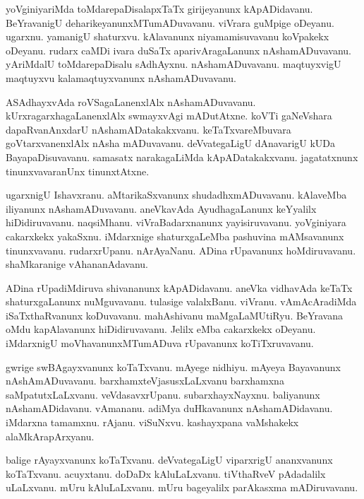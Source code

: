 \documentclass{article}
\begin{document}
\begin{mn}%
yoVginiyariMda toMdarepaDisalapxTaTx girijeyanunx kApADidavanu. BeYravanigU 
deharikeyanunxMTumADuvavanu. viVrara guMpige oDeyanu. ugarxnu. yamanigU shaturxvu. kAlavanunx 
niyamamisuvavanu koVpakekx oDeyanu. rudarx caMDi ivara duSaTx aparivAragaLanunx nAshamADuvavanu. 
yAriMdalU toMdarepaDisalu sAdhAyxnu. nAshamADuvavanu. maqtuyxvigU maqtuyxvu kalamaqtuyxvanunx 
nAshamADuvavanu.
\end{mn}

\begin{mn}%
ASAdhayxvAda roVSagaLanenxlAlx nAshamADuvavanu. kUrxragarxhagaLanenxlAlx swmayxvAgi mADutAtxne. 
koVTi gaNeVshara dapaRvanAnxdarU nAshamADatakakxvanu. keTaTxvareMbuvara goVtarxvanenxlAlx nAsha 
mADuvavanu. deVvategaLigU dAnavarigU kUDa BayapaDisuvavanu. samasatx narakagaLiMda 
kApADatakakxvanu. jagatatxnunx tinunxvavaranUnx tinunxtAtxne.
\end{mn}

\begin{mn}%
ugarxnigU Ishavxranu. aMtarikaSxvanunx shudadhxmADuvavanu. kAlaveMba iliyanunx nAshamADuvavanu. 
aneVkavAda AyudhagaLanunx keYyalilx hiDidiruvavanu. naqsiMhanu. viVraBadarxnanunx yayisiruvavanu. 
yoVginiyara cakarxkekx yakaSxnu. iMdarxnige shaturxgaLeMba pashuvina mAMsavanunx tinunxvavanu. 
rudarxrUpanu. nArAyaNanu. ADina rUpavanunx hoMdiruvavanu. shaMkaranige vAhananAdavanu. 
\end{mn}

\begin{mn}%
ADina rUpadiMdiruva shivananunx kApADidavanu. aneVka vidhavAda keTaTx shaturxgaLanunx nuMguvavanu. 
tulasige valalxBanu. viVranu. vAmAcAradiMda iSaTxthaRvanunx koDuvavanu. mahAshivanu maMgaLaMUtiRyu. 
BeYravana oMdu kapAlavanunx hiDidiruvavanu. Jelilx eMba cakarxkekx oDeyanu. iMdarxnigU 
moVhavanunxMTumADuva rUpavanunx koTiTxruvavanu.
\end{mn}

\begin{mn}%
gwrige swBAgayxvanunx koTaTxvanu. mAyege nidhiyu. mAyeya Bayavanunx nAshAmADuvavanu. 
barxhamxteVjasusxLaLxvanu barxhamxna saMpatutxLaLxvanu. veVdasavxrUpanu. subarxhayxNayxnu. 
baliyanunx nAshamADidavanu. vAmananu. adiMya duHkavanunx nAshamADidavanu. iMdarxna tamamxnu. 
rAjanu. viSuNxvu. kashayxpana vaMshakekx alaMkArapArxyanu.
\end{mn}

\begin{mn}%
balige rAyayxvanunx koTaTxvanu. deVvategaLigU viparxrigU ananxvanunx koTaTxvanu. acuyxtanu. doDaDx 
kAluLaLxvanu. tiVthaRveV pAdadalilx uLaLxvanu. mUru kAluLaLxvanu. mUru bageyalilx parAkasxma 
mADiruvavanu.
\end{mn}
\end{document}
